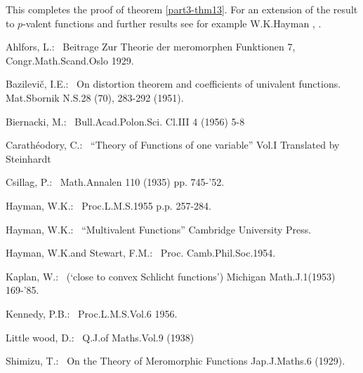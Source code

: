 This completes the proof of theorem \ref{part3-thm13}. For an
extension of the result to $p$-valent functions and further results
see for example W.K.\@ Hayman \cite{1}, \cite{2}.

\begin{thebibliography}{99}\pageoriginale
{} Ahlfors, L.\@ \cite{1}:~ Beitrage Zur Theorie der
  meromorphen Funktionen 7, Congr.\@ Math.\@ Scand.\@ Oslo 1929.

 Bazilevi\v{c}, I.E.\@ \cite{1}:~ On distortion theorem and
  coefficients of univalent functions. Mat.\@ Sbornik N.S.\@ 28 (70),
  283-292 (1951).

 Biernacki, M.\@ \cite{1}:~ Bull.\@ Acad.\@ Polon.\@ Sci.\@
  Cl.III 4 (1956) 5-8

 Carath\'eodory, C.\@ \cite{2}:~ ``Theory of Functions of
  one variable'' Vol.I Translated by Steinhardt

 Csillag, P.\@ \cite{1}:~ Math.\@ Annalen 110 (1935) pp.\@
  745-'52.

 Hayman, W.K.\@ \cite{1}:~ Proc.\@ L.M.S.\@ 1955 p.p.\@
  257-284.

 Hayman, W.K.\@ \cite{2}:~ ``Multivalent Functions''
  Cambridge University Press.

 Hayman, W.K.\@ and Stewart, F.M.\@ \cite{1}:~ Proc.\@
  Camb.\@ Phil.\@ Soc.\@ 1954.

 Kaplan, W.\@ \cite{1}:~ (`close to convex Schlicht
  functions') Michigan Math.\@ J.\@ 1(1953) 169-'85.

 Kennedy, P.B.\@ \cite{1}:~ Proc.\@ L.M.S.\@ Vol.\@ 6
  1956.

 Little wood, D.\@ \cite{1}:~ Q.J.\@ of Maths.\@ Vol.9
  (1938)

 Shimizu, T.\@ \cite{1}:~ On the Theory of Meromorphic
  Functions Jap.\@ J.\@ Maths.\@ 6 (1929).
\end{thebibliography}







